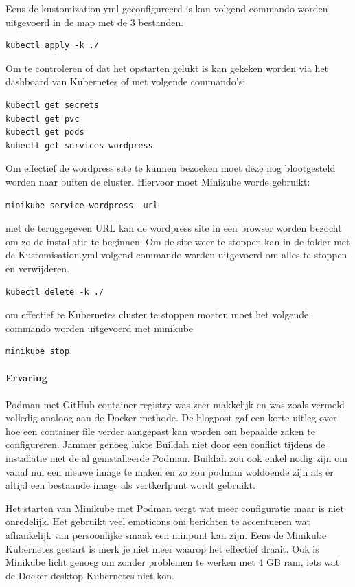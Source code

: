 Eens de kustomization.yml geconfigureerd is kan volgend commando worden uitgevoerd in de map met de 3 bestanden.
\begin{verbatim}
kubectl apply -k ./
\end{verbatim}
Om te controleren of dat het opstarten gelukt is kan gekeken worden via het dashboard van Kubernetes of met volgende commando’s:
\begin{verbatim}
kubectl get secrets
kubectl get pvc
kubectl get pods
kubectl get services wordpress
\end{verbatim}
Om effectief de wordpress site te kunnen bezoeken moet deze nog blootgesteld worden naar buiten de cluster. Hiervoor moet Minikube worde gebruikt:
\begin{verbatim}
minikube service wordpress –url
\end{verbatim}
met de teruggegeven URL kan de wordpress site in een browser worden bezocht om zo de installatie te beginnen.
Om de site weer te stoppen kan in de folder met de Kustomisation.yml volgend commando worden uitgevoerd om alles te stoppen en verwijderen.
\begin{verbatim}
kubectl delete -k ./
\end{verbatim}

om effectief te Kubernetes cluster te stoppen moeten moet het volgende commando worden uitgevoerd met minikube
\begin{verbatim}
minikube stop
\end{verbatim}

\paragraph{Ervaring}
Podman met GitHub container registry was zeer makkelijk en was zoals vermeld volledig analoog aan de Docker methode. De blogpost gaf een korte uitleg over hoe een container file verder aangepast kan worden om bepaalde zaken te configureren. Jammer genoeg lukte Buildah niet door een conflict tijdens de installatie met de al geïnstalleerde Podman. Buildah zou ook enkel nodig zijn om vanaf nul een nieuwe image te maken en zo zou podman woldoende zijn als er altijd een bestaande image als vertkerlpunt wordt gebruikt.

Het starten van Minikube met Podman vergt wat meer configuratie maar is niet onredelijk. Het gebruikt veel emoticons om berichten te accentueren wat afhankelijk van persoonlijke smaak een minpunt kan zijn. Eens de Minikube Kubernetes gestart is merk je niet meer waarop het effectief draait. Ook is Minikube licht genoeg om zonder problemen te werken met 4 GB ram, iets wat de Docker desktop Kubernetes niet kon.

